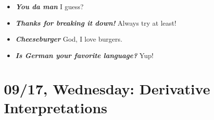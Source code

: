 \documentclass[11pt,letterpaper]{article}
\begin{document}
\begin{itemize}
\item {\bfseries\itshape You da man} I guess?

\item {\bfseries\itshape Thanks for breaking it down!} Always try at least!

\item {\bfseries\itshape Cheeseburger} God, I love burgers.

\item {\bfseries\itshape Is German your favorite language?} Yup!
\end{itemize}

\newpage
\section*{09/17, Wednesday: Derivative Interpretations\label{09-17}}
\end{document}

